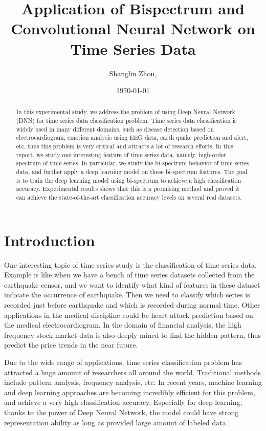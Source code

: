 \documentclass[letterpaper,12pt]{article}
\begin{document}
\title{Application of Bispectrum and Convolutional Neural Network on Time Series Data}
\author{Shanglin Zhou, }
\date{\today}
\maketitle

\begin{abstract}
In this experimental study, we address the problem of using Deep Neural Network (DNN) for time series data classification problem.
Time series data classification is widely used in many different domains, such as disease detection based on electrocardiogram, emotion analysis using EEG data, earth quake prediction and alert, etc, thus this problem is very critical and attracts a lot of research efforts.
In this report, we study one interesting feature of time series data, namely, high-order spectrum of time series. In particular, we study the bi-spectrum behavior of time series data, and further apply a deep learning model on these bi-spectrum features. The goal is to train the deep learning model using bi-spectrum to achieve a high classification accuracy. Experimental results shows that this is a promising method and proved it can achieve the state-of-the-art classification accuracy levels on several real datasets.
\end{abstract}


\section{Introduction}

One interesting topic of time series study is the classification of time series data. Example is like when we have a bench of time series datasets collected from the earthquake censor, and we want to identify what kind of features in these dataset indicate the occurrence of earthquake. 
Then we need to classify which series is recorded just before earthquake and which is recorded during normal time. 
Other applications in the medical discipline could be heart attack prediction based on the medical electrocardiogram. 
In the domain of financial analysis, the high frequency stock market data is also deeply mined to find the hidden pattern, thus predict the price trends in the near future.

Due to the wide range of applications, time series classification problem has attracted a huge amount of researchers all around the world.
Traditional methods include pattern analysis, frequency analysis, etc.
In recent years, machine learning and deep learning approaches are becoming incredibly efficient for this problem, and achieve a very high classification accuracy. Especially for deep learning, thanks to the power of Deep Neural Network, the model could have strong representation ability as long as provided large amount of labeled data.
\end{document}
